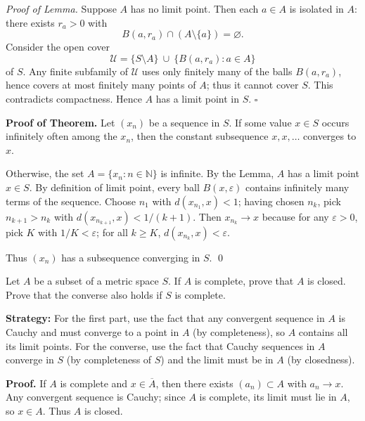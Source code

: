 \emph{Proof of Lemma.}
Suppose \(A\) has no limit point. Then each \(a\in A\) is isolated in \(A\): there exists \(r_a>0\) with
\[
B(a,r_a)\cap (A\setminus\{a\})=\varnothing.
\]
Consider the open cover
\[
\mathcal{U}=\{S\setminus A\}\ \cup\ \{B(a,r_a):a\in A\}
\]
of \(S\). Any finite subfamily of \(\mathcal{U}\) uses only finitely many of the balls \(B(a,r_a)\), hence covers at most finitely many points of \(A\); thus it cannot cover \(S\). This contradicts compactness. Hence \(A\) has a limit point in \(S\). \(\square\)

\textbf{Proof of Theorem.}
Let \((x_n)\) be a sequence in \(S\).
If some value \(x\in S\) occurs infinitely often among the \(x_n\), then the constant subsequence \(x,x,\dots\) converges to \(x\).

Otherwise, the set \(A=\{x_n:n\in\mathbb{N}\}\) is infinite. By the Lemma, \(A\) has a limit point \(x\in S\). By definition of limit point, every ball \(B(x,\varepsilon)\) contains infinitely many terms of the sequence. Choose \(n_1\) with \(d(x_{n_1},x)<1\); having chosen \(n_k\), pick \(n_{k+1}>n_k\) with \(d(x_{n_{k+1}},x)<1/(k+1)\). Then \(x_{n_k}\to x\) because for any \(\varepsilon>0\), pick \(K\) with \(1/K<\varepsilon\); for all \(k\ge K\), \(d(x_{n_k},x)<\varepsilon\).

Thus \((x_n)\) has a subsequence converging in \(S\). \qed
\medskip



\begin{problembox}
\begin{problemstatement}
Let $A$ be a subset of a metric space $S$. If $A$ is complete, prove that $A$ is closed. Prove that the converse also holds if $S$ is complete.
\end{problemstatement}
\end{problembox}

\noindent\textbf{Strategy:} For the first part, use the fact that any convergent sequence in $A$ is Cauchy and must converge to a point in $A$ (by completeness), so $A$ contains all its limit points. For the converse, use the fact that Cauchy sequences in $A$ converge in $S$ (by completeness of $S$) and the limit must be in $A$ (by closedness).

\noindent\textbf{Proof.}
If $A$ is complete and $x\in\overline{A}$, then there exists $(a_n)\subset A$ with $a_n\to x$. Any convergent sequence is Cauchy; since $A$ is complete, its limit must lie in $A$, so $x\in A$. Thus $A$ is closed.

